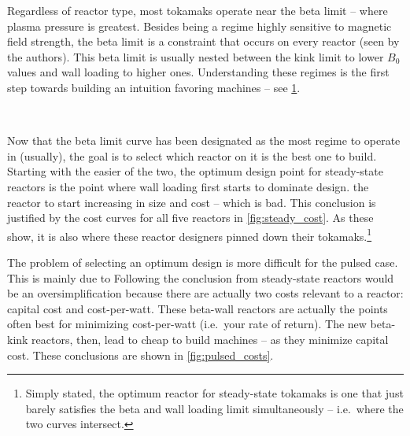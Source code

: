 Regardless of reactor type, most  tokamaks operate near the beta limit -- where plasma pressure is greatest. Besides being a regime highly sensitive to magnetic field strength, the beta limit is a constraint that occurs on every reactor (seen by the authors). This beta limit  is usually nested between the kink limit  to lower $B_0$ values and wall loading  to higher ones. Understanding these regimes is the first step towards building an intuition favoring  machines -- see \cref{fig:limit_regimes}.

\begin{figure}
\centering
\begin{adjustbox}{width=0.8\textwidth}
	
\end{adjustbox}
\caption{} ~ \\
\label{fig:limit_regimes}
\end{figure}

Now that the beta limit curve has been designated as the most  regime to operate in (usually), the goal is to select which reactor on it is the best one to build. Starting with the easier of the two, the optimum design point for steady-state reactors is the point where wall loading first starts to dominate  design.  the reactor to start increasing in size and cost -- which is bad. This conclusion is justified by the cost curves for all five reactors in \cref{fig:steady_cost}. As these show, it is also where these reactor designers pinned down their tokamaks.\footnote{Simply stated, the optimum reactor for steady-state tokamaks is one that just barely satisfies the beta and wall loading limit simultaneously -- i.e.\ where the two curves intersect. }

The problem of selecting an optimum design is more difficult for the pulsed case. This is mainly due to  Following the conclusion from steady-state reactors would be an oversimplification because there are actually two costs relevant to a reactor: capital cost and cost-per-watt. These beta-wall reactors are actually the points often best for minimizing cost-per-watt (i.e.\ your rate of return). The new beta-kink reactors, then, lead to cheap to build machines -- as they minimize capital cost. These conclusions are shown in \cref{fig:pulsed_costs}.

